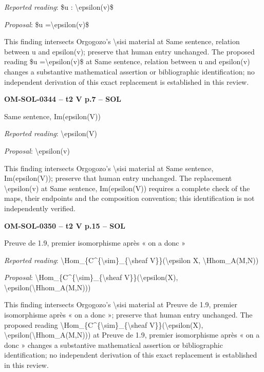 \emph{Reported reading}: \$u : \textbackslash{}epsilon(v)\$\par
\emph{Proposal}: \$u =\allowbreak  \textbackslash{}epsilon(v)\$\par
This finding intersects Orgogozo's \textbackslash{}sisi material at Same sentence, relation between u and epsilon(v); preserve that human entry unchanged. The proposed reading \$u =\allowbreak  \textbackslash{}epsilon(v)\$ at Same sentence, relation between u and epsilon(v) changes a substantive mathematical assertion or bibliographic identification; no independent derivation of this exact replacement is established in this review.\par
\par\noindent\textbf{OM-SOL-0344 -- t2 V p.7 -- SOL}\par
Same sentence, Im(epsilon(V))\par
\emph{Reported reading}: \textbackslash{}epsilon(V)\par
\emph{Proposal}: \textbackslash{}epsilon(v)\par
This finding intersects Orgogozo's \textbackslash{}sisi material at Same sentence, Im(epsilon(V)); preserve that human entry unchanged. The replacement \textbackslash{}epsilon(v) at Same sentence, Im(epsilon(V)) requires a complete check of the maps, their endpoints and the composition convention; this identification is not independently verified.\par
\par\noindent\textbf{OM-SOL-0350 -- t2 V p.15 -- SOL}\par
Preuve de 1.9, premier isomorphisme après « on a donc »\par
\emph{Reported reading}: \textbackslash{}Hom\_\{C\textasciicircum{}\{\textbackslash{}sim\}\_\{\textbackslash{}sheaf V\}\}(\textbackslash{}epsilon X, \textbackslash{}Hhom\_A(M,N))\par
\emph{Proposal}: \textbackslash{}Hom\_\{C\textasciicircum{}\{\textbackslash{}sim\}\_\{\textbackslash{}sheaf V\}\}(\textbackslash{}epsilon(X), \textbackslash{}epsilon(\textbackslash{}Hhom\_A(M,N)))\par
This finding intersects Orgogozo's \textbackslash{}sisi material at Preuve de 1.9, premier isomorphisme après « on a donc »; preserve that human entry unchanged. The proposed reading \textbackslash{}Hom\_\{C\textasciicircum{}\{\textbackslash{}sim\}\_\{\textbackslash{}sheaf V\}\}(\textbackslash{}epsilon(X), \textbackslash{}epsilon(\textbackslash{}Hhom\_A(M,N))) at Preuve de 1.9, premier isomorphisme après « on a donc » changes a substantive mathematical assertion or bibliographic identification; no independent derivation of this exact replacement is established in this review.\par
